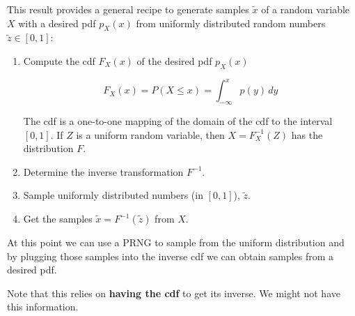 \begin{frame}


This result provides 
a general recipe to generate
samples $\tilde x$ of a random variable $X$ with a desired pdf $p_X(x)$
from uniformly distributed random numbers $\tilde z \in [0,1]$:
\begin{enumerate}
\item Compute the cdf $F_X(x)$ of the desired pdf $p_X(x)$

\begin{equation}
F_X(x) = P(X \leq x) = \int_{-\infty}^{x} p(y)\,dy
\end{equation}

The cdf is a one-to-one mapping of the domain of the cdf to the interval $[0,1]$.
 If $Z$ is a uniform random variable, then $X=F_X^{-1}(Z)$ has the distribution $F$.

\item Determine the inverse transformation $F^{-1}$.

\item Sample uniformly distributed numbers (in $[0,1]$), $\tilde z$.
\item Get the samples $\tilde x=F^{-1}(\tilde z)$ from $X$. 
\end{enumerate}

At this point we can use a PRNG to sample from the uniform distribution and 
by plugging those samples into the inverse cdf we can obtain samples from a desired pdf.


\end{frame}

\begin{frame}

Note that this relies on \textbf{having the cdf} to get its inverse. We might not have this information.

\pause


\end{frame}

